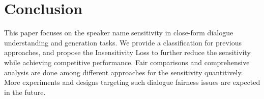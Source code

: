 \section{Conclusion}

This paper focuses on the speaker name sensitivity in close-form dialogue understanding and generation tasks. We provide a classification for previous approaches, and propose the Insensitivity Loss to further reduce the sensitivity while achieving competitive performance. Fair comparisons and comprehensive analysis are done among different approaches for the sensitivity quantitively. 
More experiments and designs targeting such dialogue fairness issues are expected in the future.